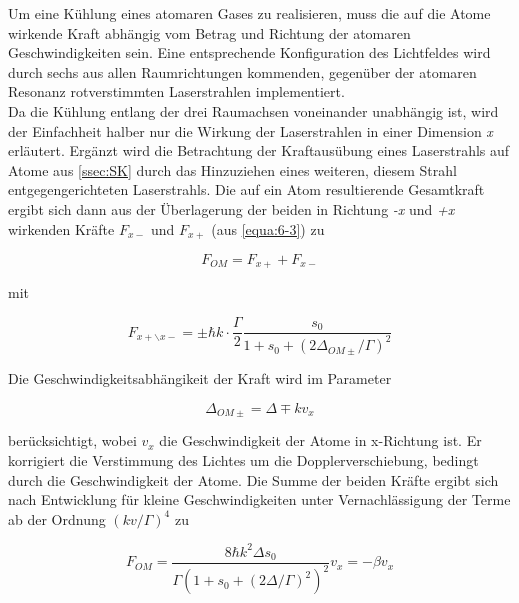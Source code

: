 \documentclass[
class=book,
accentcolor=1b,
custommargins=geometry,
fontsize=11pt,
thesis={type=Versuchsanleitung},
ruledheaders=all,
headline=false,
instbox=false,
marginpar=false,
title=small,
ignore-missing-data=true,
twoside=false,
pdfa=false %
]{apqpub}
\begin{document}
				Um eine Kühlung eines atomaren Gases zu realisieren, muss die auf die Atome wirkende Kraft abhängig vom Betrag und Richtung der atomaren Geschwindigkeiten sein. Eine entsprechende Konfiguration des Lichtfeldes wird durch sechs aus allen Raumrichtungen kommenden, gegenüber der atomaren Resonanz rotverstimmten Laserstrahlen implementiert.\\
				Da die Kühlung entlang der drei Raumachsen voneinander unabhängig ist, wird der Einfachheit halber
				nur die Wirkung der Laserstrahlen in einer Dimension \textit{x} erläutert. Ergänzt wird die Betrachtung der Kraftausübung eines Laserstrahls auf Atome aus \autoref{ssec:SK} durch das Hinzuziehen eines weiteren, diesem Strahl entgegengerichteten Laserstrahls. Die auf ein Atom resultierende Gesamtkraft ergibt sich dann aus der Überlagerung der beiden in Richtung \textit{-x} und \textit{+x} wirkenden Kräfte $F_{x-}$ und $F_{x+}$ (aus \autoref{equa:6-3}) zu
				
				\begin{equation}
				F_{OM} = F_{x+} + F_{x-}
				\end{equation}
				
				mit
				
				\begin{equation}\label{equa:6-5}
				F_{x+\backslash x-} = \pm \hbar k \cdot \frac{\varGamma}{2} \frac{s_0}{1+s_0+(2\varDelta_{OM\pm}/\varGamma)^2} 
				\end{equation}
				
				Die Geschwindigkeitsabhängikeit der Kraft wird im Parameter
				
				\begin{equation}
				\varDelta_{OM\pm} = \varDelta \mp k v_{x}
				\end{equation}
				
				berücksichtigt, wobei $v_x$ die Geschwindigkeit der Atome in x-Richtung ist. Er korrigiert die Verstimmung des Lichtes um die Dopplerverschiebung, bedingt durch die Geschwindigkeit der Atome. Die Summe der beiden Kräfte ergibt sich nach Entwicklung für kleine Geschwindigkeiten unter Vernachlässigung der Terme ab der Ordnung $(kv/\varGamma)^4$ zu
				
				\begin{equation}\label{equa:6-7}
				F_{OM} = \frac{8 \hbar k^2 \varDelta s_0}{\varGamma (1+s_0 + (2\varDelta/\varGamma)^2)^2} v_x = -\beta v_x
				\end{equation}
				
\end{document}
